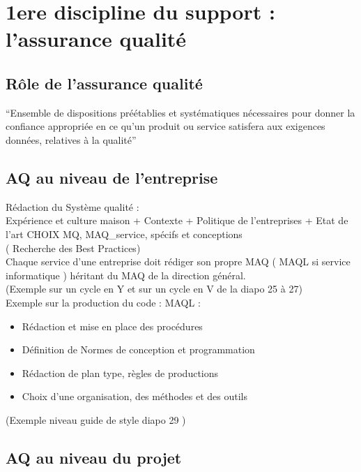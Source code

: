 \section{1ere discipline du support : l'assurance qualité}

	\subsection{Rôle de l’assurance qualité}

“Ensemble de dispositions préétablies et systématiques nécessaires pour donner la confiance appropriée en ce qu’un produit ou service satisfera aux exigences données, relatives à la qualité”


	\subsection{AQ au niveau de l’entreprise}

Rédaction du Système qualité :\\
	Expérience et culture maison + Contexte + Politique de l’entreprises + Etat de l’art
		\rightarrow CHOIX \rightarrow MQ, MAQ_service, spécifs et conceptions\\
			( Recherche des Best Practices)\\

Chaque service d’une entreprise doit rédiger son propre MAQ ( MAQL si service informatique ) héritant du MAQ de la direction général.\\

(Exemple sur un cycle en Y et sur un cycle en V de la diapo 25 à 27)\\

Exemple sur la production du code : MAQL :
\begin{itemize}
\item Rédaction et mise en place des procédures
\item Définition de Normes de conception et programmation
\item Rédaction de plan type, règles de productions
\item Choix d’une organisation, des méthodes et des outils
\end{itemize}

(Exemple niveau guide de style diapo 29 )

	\subsection{AQ au niveau du projet}

